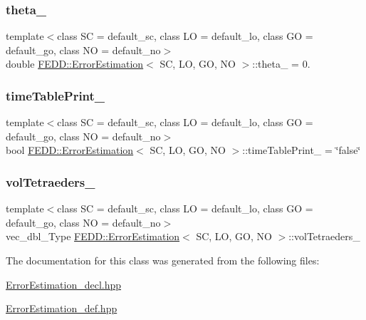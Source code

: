 \subsubsection{\texorpdfstring{theta\+\_\+}{theta\_}}
{\footnotesize\ttfamily template$<$class SC  = default\+\_\+sc, class LO  = default\+\_\+lo, class GO  = default\+\_\+go, class NO  = default\+\_\+no$>$ \\
double \hyperlink{classFEDD_1_1ErrorEstimation}{F\+E\+D\+D\+::\+Error\+Estimation}$<$ SC, LO, GO, NO $>$\+::theta\+\_\+ = 0.}

\mbox{\label{classFEDD_1_1ErrorEstimation_aa1eaedab0d65507fec1b175f971bdecd}} 
\subsubsection{\texorpdfstring{time\+Table\+Print\+\_\+}{timeTablePrint\_}}
{\footnotesize\ttfamily template$<$class SC  = default\+\_\+sc, class LO  = default\+\_\+lo, class GO  = default\+\_\+go, class NO  = default\+\_\+no$>$ \\
bool \hyperlink{classFEDD_1_1ErrorEstimation}{F\+E\+D\+D\+::\+Error\+Estimation}$<$ SC, LO, GO, NO $>$\+::time\+Table\+Print\+\_\+ = \char`\"{}false\char`\"{}}

\mbox{\label{classFEDD_1_1ErrorEstimation_a85be16035eebc82df031a58d7cdf8e8e}} 
\subsubsection{\texorpdfstring{vol\+Tetraeders\+\_\+}{volTetraeders\_}}
{\footnotesize\ttfamily template$<$class SC  = default\+\_\+sc, class LO  = default\+\_\+lo, class GO  = default\+\_\+go, class NO  = default\+\_\+no$>$ \\
vec\+\_\+dbl\+\_\+\+Type \hyperlink{classFEDD_1_1ErrorEstimation}{F\+E\+D\+D\+::\+Error\+Estimation}$<$ SC, LO, GO, NO $>$\+::vol\+Tetraeders\+\_\+\hspace{0.3cm}{\ttfamily [protected]}}



The documentation for this class was generated from the following files\+:\begin{DoxyCompactItemize}
\item 
\hyperlink{ErrorEstimation__decl_8hpp}{Error\+Estimation\+\_\+decl.\+hpp}\item 
\hyperlink{ErrorEstimation__def_8hpp}{Error\+Estimation\+\_\+def.\+hpp}\end{DoxyCompactItemize}
